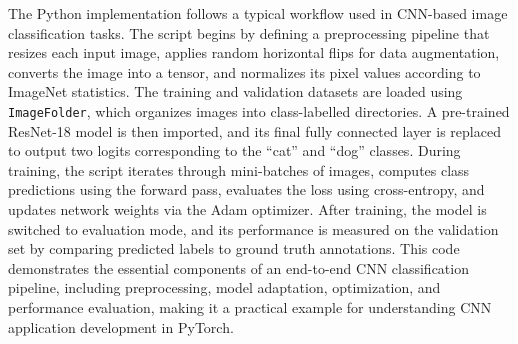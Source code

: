 The Python implementation follows a typical workflow used in CNN-based image classification tasks. The script begins by defining a preprocessing pipeline that resizes each input image, applies random horizontal flips for data augmentation, converts the image into a tensor, and normalizes its pixel values according to ImageNet statistics. The training and validation datasets are loaded using \texttt{ImageFolder}, which organizes images into class-labelled directories. A pre-trained ResNet-18 model is then imported, and its final fully connected layer is replaced to output two logits corresponding to the ``cat'' and ``dog'' classes. During training, the script iterates through mini-batches of images, computes class predictions using the forward pass, evaluates the loss using cross-entropy, and updates network weights via the Adam optimizer. After training, the model is switched to evaluation mode, and its performance is measured on the validation set by comparing predicted labels to ground truth annotations. This code demonstrates the essential components of an end-to-end CNN classification pipeline, including preprocessing, model adaptation, optimization, and performance evaluation, making it a practical example for understanding CNN application development in PyTorch.